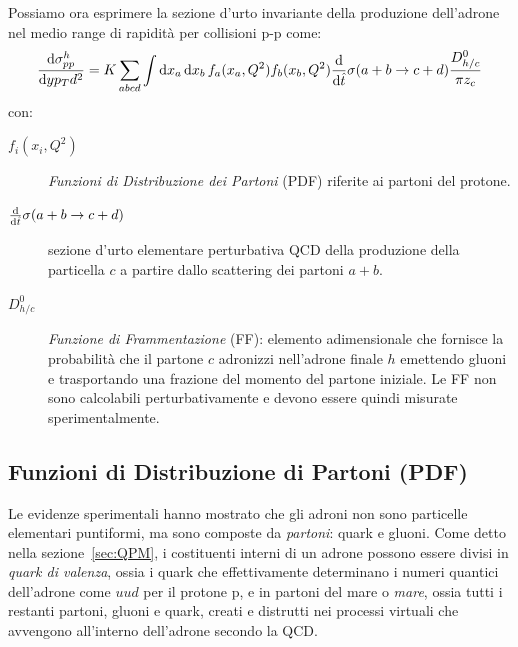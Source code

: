     Possiamo ora esprimere la sezione d'urto invariante della produzione dell'adrone nel medio range di rapidità per collisioni p-p come:
    \begin{equation*}
        \dv{\sigma_{pp}^h}{y p_T d^2} = K \sum_{abcd}{\int{\dd{x_a} \dd{x_b} f_{a}(x_a,Q^2) f_{b}(x_b,Q^2) \dv{\hat{t}} \sigma(a + b \to c + d) \frac{D_{{h}/{c}}^0}{\pi z_c}}}
    \end{equation*}
    con:
    \begin{description}
        \item[$f_i(x_i,Q^2)$] \textit{Funzioni di Distribuzione dei Partoni} (PDF) riferite ai partoni del protone.

        \item[$\dv{\hat{t}} \sigma(a + b \to c + d)$] sezione d'urto elementare perturbativa QCD della produzione della particella $c$ a partire dallo scattering dei partoni $a + b$.

        \item[$D_{{h}/{c}}^0$] \textit{Funzione di Frammentazione} (FF): elemento adimensionale che fornisce la probabilità che il partone $c$ adronizzi nell'adrone finale $h$ emettendo gluoni e trasportando una frazione del momento del partone iniziale. Le FF non sono calcolabili perturbativamente e devono essere quindi misurate sperimentalmente.
    \end{description}

    \subsection{Funzioni di Distribuzione di Partoni (PDF)}
    \label{sec:PDF}
        Le evidenze sperimentali hanno mostrato che gli adroni non sono particelle elementari puntiformi, ma sono composte da \textit{partoni}: quark e gluoni. Come detto nella sezione~\ref{sec:QPM}, i costituenti interni di un adrone possono essere divisi in \textit{quark di valenza}, ossia i quark che effettivamente determinano i numeri quantici dell'adrone come $uud$ per il protone p, e in partoni del mare o \textit{mare}, ossia tutti i restanti partoni, gluoni e quark, creati e distrutti nei processi virtuali che avvengono all'interno dell'adrone secondo la QCD.

